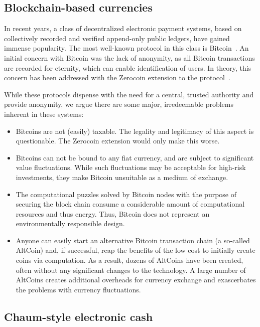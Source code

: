 \documentclass{llncs}
\begin{document}
\subsection{Blockchain-based currencies}

In recent years, a class of decentralized electronic payment systems,
based on collectively recorded and verified append-only public
ledgers, have gained immense popularity.  The most well-known protocol
in this class is Bitcoin~\cite{nakamoto2008bitcoin}.  An initial
concern with Bitcoin was the lack of anonymity, as all Bitcoin
transactions are recorded for eternity, which can enable
identification of users.  In theory, this concern has been addressed
with the Zerocoin extension to the protocol~\cite{miers2013zerocoin}.

While these protocols dispense with the need for a central, trusted
authority and provide anonymity, we argue there are some major,
irredeemable problems inherent in these systems:

\begin{itemize}
  \item Bitcoins are not (easily) taxable.  The legality and legitimacy of
    this aspect is questionable.  The Zerocoin extension would only make
    this worse.
  \item Bitcoins can not be bound to any fiat currency, and are subject to
    significant value fluctuations.  While such fluctuations may be
    acceptable for high-risk investments, they make Bitcoin unsuitable as
    a medium of exchange.
  \item The computational puzzles solved by Bitcoin nodes with the purpose
    of securing the block chain
    consume a considerable amount of computational resources and thus
    energy.  Thus, Bitcoin does not represent an environmentally responsible
    design.
  \item Anyone can easily start an alternative Bitcoin transaction chain
    (a so-called AltCoin) and, if successful, reap the benefits of the low
    cost to initially create coins via computation.  As a result, dozens of
    AltCoins have been created, often without any significant changes to the
    technology.  A large number of AltCoins creates additional overheads for
    currency exchange and exascerbates the problems with currency fluctuations.
\end{itemize}

\subsection{Chaum-style electronic cash}
\end{document}
